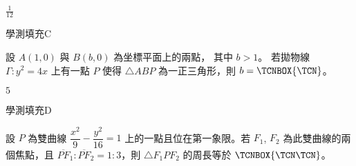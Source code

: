\begin{QUESTIONS}
\begin{QUESTION}
\begin{QANS}
            $\frac{1}{12}$
        \end{QANS}
        \begin{QSOLLIST}
        \end{QSOLLIST}
        \begin{QEMPTYSPACE}
        \end{QEMPTYSPACE}
    \end{QUESTION}
    \begin{QUESTION}
        \begin{ExamInfo}{92}{學測}{填充}{C}
        \end{ExamInfo}
        \begin{ExamAnsRateInfo}{27}{52}{21}{8}
        \end{ExamAnsRateInfo}
        \begin{QBODY}
            設 $A(1,0)$ 與 $B(b,0)$ 為坐標平面上的兩點， 其中 $b>1$。 
            若拋物線 $\Gamma : y^2=4x$ 上有一點 $P$ 使得 $\triangle ABP$ 為一正三角形，則 $b= 
            \TCNBOX{\TCN}$。
        \end{QBODY}
        \begin{QFROMS}
        \end{QFROMS}
        \begin{QTAGS}\end{QTAGS}
        \begin{QANS}
            $5$
        \end{QANS}
        \begin{QSOLLIST}
        \end{QSOLLIST}
        \begin{QEMPTYSPACE}
        \end{QEMPTYSPACE}
    \end{QUESTION}
    \begin{QUESTION}
        \begin{ExamInfo}{92}{學測}{填充}{D}
        \end{ExamInfo}
        \begin{ExamAnsRateInfo}{16}{39}{7}{2}
        \end{ExamAnsRateInfo}
        \begin{QBODY}
            設 $P$ 為雙曲線 $\dfrac{x^2}{9} - \dfrac{y^2}{16} = 1$ 上的一點且位在第一象限。若 $F_1$,  $F_2$ 為此雙曲線的兩個焦點，且 $\overline{PF}_1 : \overline{PF}_2 = 1:3 $，則 $\triangle F_1PF_2$ 的周長等於 $
            \TCNBOX{\TCN\TCN}$。
        \end{QBODY}
        \begin{QFROMS}

\end{QFROMS}
\end{QUESTION}
\end{QUESTIONS}
